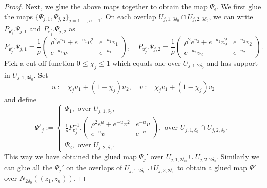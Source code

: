 \documentclass[a4paper,11pt]{amsart}
\theoremstyle{definition}
\numberwithin{equation}{section}
\newcommand{\mv} {\mathfrak v}
\begin{document}
\begin{proof}
    Next, we glue the above maps together to obtain the map $\Psi_\epsilon$. We first glue the maps $\{\Psi_{j,1},\Psi_{j,2}\}_{j=1,\ldots,n-1}$. On each overlap $U_{j,1,3\delta_0}\cap U_{j,2,3\delta_0}$, we can write $P_{\mv_{j}^\epsilon}.\Psi_{j,1}$ and $P_{\mv_{j}^\epsilon}.\Psi_{j,2}$ as 
    $$P_{\mv_j^\epsilon}.\Psi_{j,1}=\frac{1}{\rho}\left(\begin{matrix}
        \rho^2e^{u_1}+e^{-u_1}v_1^2 & e^{-u_1}v_1 \\ e^{-u_1}v_1 & e^{-u_1}
    \end{matrix}\right),\quad P_{\mv_j^\epsilon}.\Psi_{j,2}=\frac{1}{\rho}\left(\begin{matrix}
        \rho^2e^{u_2}+e^{-u_2}v_2^2 & e^{-u_2}v_2 \\ e^{-u_2}v_2 & e^{-u_2}
    \end{matrix}\right).$$
    Pick a cut-off function $0\leq\chi_j\leq1$ which equals one over $U_{j,1,2\delta_0}$ and has support in $U_{j,1,3\delta_0}$. Set $$u:=\chi_j u_1+(1-\chi_j)u_2, \quad v:=\chi_j v_1+(1-\chi_j)v_2$$ and define
    $$\Psi'_j:=\begin{cases}
        \Psi_1,\text{ over }U_{j,1,\delta_0},\\
        \frac{1}{\rho} P_{\mv_j^\epsilon}^{-1}. \left(\begin{matrix}
        \rho^2e^{u}+e^{-u}v^2 & e^{-u}v \\ e^{-u}v & e^{-u}
    \end{matrix}\right), \text{ over } U_{j,1,\delta_0}\cap U_{j,2,\delta_0},\\
    \Psi_2, \text{ over }U_{j,2,\delta_0}.
    \end{cases}$$
    This way we have obtained the glued map $\Psi_j'$ over $U_{j,1,2\delta_0}\cup U_{j,2,2\delta_0}$. Similarly we can glue all the $\Psi_j'$ on the overlaps of $U_{j,1,2\delta_0}\cup U_{j,2,2\delta_0}$ to obtain a glued map $\Psi'$ over $N_{2\delta_0}((z_1,z_n))$. 






\end{proof}
\end{document}
